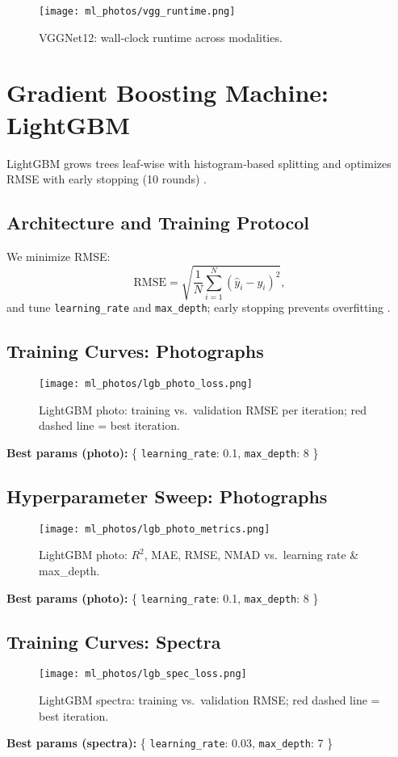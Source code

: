 \documentclass[english,bachelor,oneside]{ctufit-thesis}
\begin{document}
\begin{figure}[H]
  \centering
  \texttt{[image: ml\_photos/vgg\_runtime.png]}
  \caption{VGGNet12: wall‐clock runtime across modalities.}
  \label{fig:vgg_runtime}
\end{figure}

\section{Gradient Boosting Machine: LightGBM}
LightGBM grows trees leaf‐wise with histogram‐based splitting and optimizes RMSE with early stopping (10 rounds) \cite{Ke2017,Friedman2001}.

\subsection{Architecture and Training Protocol}
We minimize RMSE:
\[
  \mathrm{RMSE} = \sqrt{\frac1N\sum_{i=1}^N(\hat y_i - y_i)^2},
\]
and tune \texttt{learning\_rate} and \texttt{max\_depth}; early stopping prevents overfitting \cite{prechelt2002early}.

\subsection{Training Curves: Photographs}
\begin{figure}[H]
  \centering
  \texttt{[image: ml\_photos/lgb\_photo\_loss.png]}
  \caption{LightGBM photo: training vs.\ validation RMSE per iteration; red dashed line = best iteration.}
  \label{fig:lgb_photo_loss}
\end{figure}
\noindent\textbf{Best params (photo):} \{ \texttt{learning\_rate}: 0.1, \texttt{max\_depth}: 8 \}\\

\subsection{Hyperparameter Sweep: Photographs}
\begin{figure}[H]
  \centering
  \texttt{[image: ml\_photos/lgb\_photo\_metrics.png]}
  \caption{LightGBM photo: $R^2$, MAE, RMSE, NMAD vs.\ learning rate \& max\_depth.}
  \label{fig:lgb_photo_metrics}
\end{figure}
\noindent\textbf{Best params (photo):} \{ \texttt{learning\_rate}: 0.1, \texttt{max\_depth}: 8 \}\\

\subsection{Training Curves: Spectra}
\begin{figure}[H]
  \centering
  \texttt{[image: ml\_photos/lgb\_spec\_loss.png]}
  \caption{LightGBM spectra: training vs.\ validation RMSE; red dashed line = best iteration.}
  \label{fig:lgb_spec_loss}
\end{figure}
\noindent\textbf{Best params (spectra):} \{ \texttt{learning\_rate}: 0.03, \texttt{max\_depth}: 7 \}\\
\end{document}
